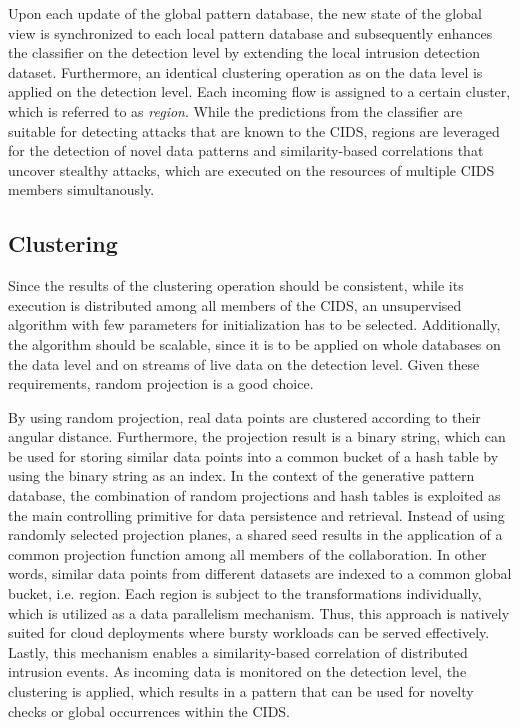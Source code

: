 Upon each update of the global pattern database, the new state of the global view is synchronized to each local pattern database and subsequently enhances the classifier on the detection level by extending the local intrusion detection dataset. Furthermore, an identical clustering operation as on the data level is applied on the detection level. Each incoming flow is assigned to a certain cluster, which is referred to as \textit{region}. While the predictions from the classifier are suitable for detecting attacks that are known to the CIDS, regions are leveraged for the detection of novel data patterns and similarity-based correlations that uncover stealthy attacks, which are executed on the resources of multiple CIDS members simultanously.

\subsection{Clustering}\label{subsec:clustering}

Since the results of the clustering operation should be consistent, while its execution is distributed among all members of the CIDS, an unsupervised algorithm with few parameters for initialization has to be selected. Additionally, the algorithm should be scalable, since it is to be applied on whole databases on the data level and on streams of live data on the detection level. Given these requirements, random projection is a good choice. 


By using random projection, real data points are clustered according to their angular distance. Furthermore, the projection result is a binary string, which can be used for storing similar data points into a common bucket of a hash table by using the binary string as an index. In the context of the generative pattern database, the combination of random projections and hash tables is exploited as the main controlling primitive for data persistence and retrieval. Instead of using randomly selected projection planes, a shared seed results in the application of a common projection function among all members of the collaboration. In other words, similar data points from different datasets are indexed to a common global bucket, i.e. region. Each region is subject to the transformations individually, which is utilized as a data parallelism mechanism. Thus, this approach is natively suited for cloud deployments where bursty workloads can be served effectively. Lastly, this mechanism enables a similarity-based correlation of distributed intrusion events. As incoming data is monitored on the detection level, the clustering is applied, which results in a pattern that can be used for novelty checks or global occurrences within the CIDS.

